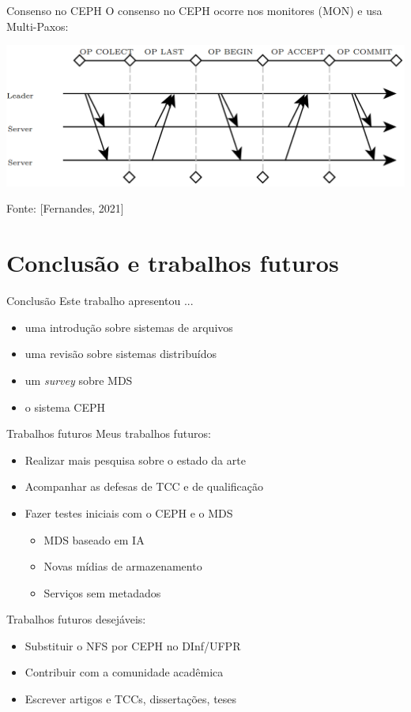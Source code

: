 \documentclass[xcolor=dvipsnames,table]{beamer}
\begin{document}
\begin{frame}{Consenso no CEPH}
	O consenso no CEPH ocorre nos monitores (MON) e usa Multi-Paxos:
	\begin{center}
		\includegraphics[scale=0.25]{ceph-paxos-2.png}
	\end{center}
	Fonte: [Fernandes, 2021]
\end{frame}

\section{Conclusão e trabalhos futuros}
\begin{frame}{Conclusão}
	Este trabalho apresentou ...
	\begin{itemize}
		\item uma introdução sobre sistemas de arquivos
		\item uma revisão sobre sistemas distribuídos
		\item um \textit{survey} sobre MDS
		\item o sistema CEPH
	\end{itemize}
\end{frame}

\begin{frame}{Trabalhos futuros}
	Meus trabalhos futuros:
	\begin{itemize}
		\item Realizar mais pesquisa sobre o estado da arte
		\item Acompanhar as defesas de TCC e de qualificação
		\item Fazer testes iniciais com o CEPH e o MDS
		\begin{itemize}
			\item MDS baseado em IA
			\item Novas mídias de armazenamento
			\item Serviços sem metadados
		\end{itemize}
	\end{itemize}
	
	\pause
	
	Trabalhos futuros desejáveis:
	\begin{itemize}
		\item Substituir o NFS por CEPH no DInf/UFPR
		\item Contribuir com a comunidade acadêmica
		\item Escrever artigos e TCCs, dissertações, teses
	\end{itemize}
\end{frame}
\end{document}
